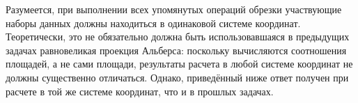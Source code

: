 Разумеется, при выполнении всех упомянутых операций обрезки участвующие наборы данных должны находиться в одинаковой системе координат. Теоретически, это не обязательно должна быть использовавшаяся в предыдущих задачах равновеликая проекция Альберса: поскольку вычисляются соотношения площадей, а не сами площади, результаты расчета в любой системе координат не должны существенно отличаться. Однако, приведённый ниже ответ получен при расчете в той же системе координат, что и в прошлых задачах.

